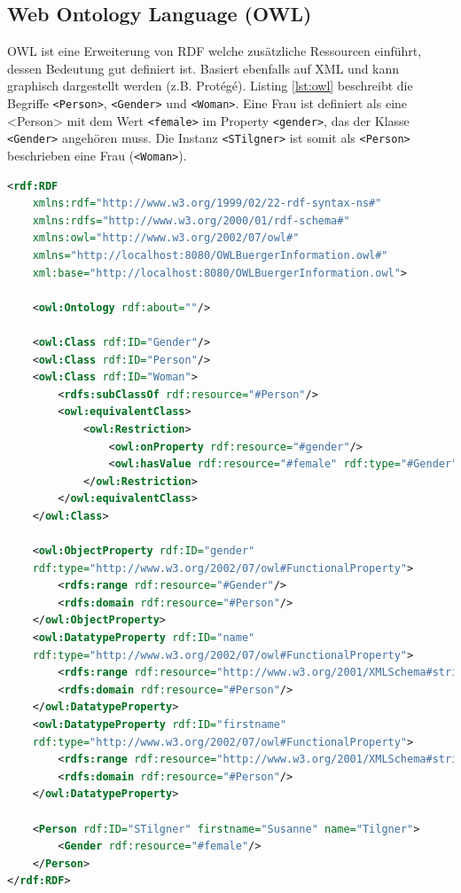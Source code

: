 \subsection{Web Ontology Language (OWL)}

OWL ist eine Erweiterung von RDF welche zusätzliche Ressourcen einführt, dessen Bedeutung gut definiert ist. Basiert ebenfalls auf XML und kann graphisch dargestellt werden (z.B. Protégé). Listing \ref{lst:owl} beschreibt die Begriffe \verb|<Person>|, \verb|<Gender>| und \verb|<Woman>|. Eine Frau ist definiert als eine <Person> mit dem Wert \verb|<female>| im Property \verb|<gender>|, das der Klasse \verb|<Gender>| angehören muss. Die Instanz \verb|<STilgner>| ist somit als \verb|<Person>| beschrieben eine Frau (\verb|<Woman>|). 

\begin{lstlisting}[language=XML, caption= OWL Beispiel, label=lst:owl]
<rdf:RDF
	xmlns:rdf="http://www.w3.org/1999/02/22-rdf-syntax-ns#"
	xmlns:rdfs="http://www.w3.org/2000/01/rdf-schema#"
	xmlns:owl="http://www.w3.org/2002/07/owl#"
	xmlns="http://localhost:8080/OWLBuergerInformation.owl#"
	xml:base="http://localhost:8080/OWLBuergerInformation.owl">

	<owl:Ontology rdf:about=""/>   
	
	<owl:Class rdf:ID="Gender"/>
	<owl:Class rdf:ID="Person"/> 
	<owl:Class rdf:ID="Woman">
		<rdfs:subClassOf rdf:resource="#Person"/>
		<owl:equivalentClass>
			<owl:Restriction>
				<owl:onProperty rdf:resource="#gender"/>
				<owl:hasValue rdf:resource="#female" rdf:type="#Gender"/>
			</owl:Restriction>
		</owl:equivalentClass>
	</owl:Class>
	
	<owl:ObjectProperty rdf:ID="gender"
	rdf:type="http://www.w3.org/2002/07/owl#FunctionalProperty">
		<rdfs:range rdf:resource="#Gender"/>
		<rdfs:domain rdf:resource="#Person"/>
	</owl:ObjectProperty>
	<owl:DatatypeProperty rdf:ID="name"
	rdf:type="http://www.w3.org/2002/07/owl#FunctionalProperty">
		<rdfs:range rdf:resource="http://www.w3.org/2001/XMLSchema#string"/>
		<rdfs:domain rdf:resource="#Person"/>
	</owl:DatatypeProperty>
	<owl:DatatypeProperty rdf:ID="firstname"
	rdf:type="http://www.w3.org/2002/07/owl#FunctionalProperty">
		<rdfs:range rdf:resource="http://www.w3.org/2001/XMLSchema#string"/>
		<rdfs:domain rdf:resource="#Person"/>
	</owl:DatatypeProperty>
	
	<Person rdf:ID="STilgner" firstname="Susanne" name="Tilgner">
		<Gender rdf:resource="#female"/>
	</Person>
</rdf:RDF>
\end{lstlisting}

